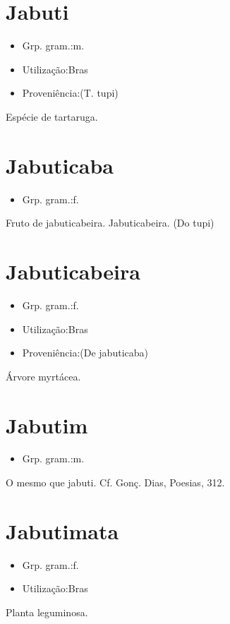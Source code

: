 \documentclass{article}
\begin{document}
\section{Jabuti}
\begin{itemize}
\item {Grp. gram.:m.}
\end{itemize}
\begin{itemize}
\item {Utilização:Bras}
\end{itemize}
\begin{itemize}
\item {Proveniência:(T. tupi)}
\end{itemize}
Espécie de tartaruga.
\section{Jabuticaba}
\begin{itemize}
\item {Grp. gram.:f.}
\end{itemize}
Fruto de jabuticabeira.
Jabuticabeira.
(Do tupi)
\section{Jabuticabeira}
\begin{itemize}
\item {Grp. gram.:f.}
\end{itemize}
\begin{itemize}
\item {Utilização:Bras}
\end{itemize}
\begin{itemize}
\item {Proveniência:(De \textunderscore jabuticaba\textunderscore )}
\end{itemize}
Árvore myrtácea.
\section{Jabutim}
\begin{itemize}
\item {Grp. gram.:m.}
\end{itemize}
O mesmo que \textunderscore jabuti\textunderscore . Cf. Gonç. Dias, \textunderscore Poesias\textunderscore , 312.
\section{Jabutimata}
\begin{itemize}
\item {Grp. gram.:f.}
\end{itemize}
\begin{itemize}
\item {Utilização:Bras}
\end{itemize}
Planta leguminosa.
\end{document}
